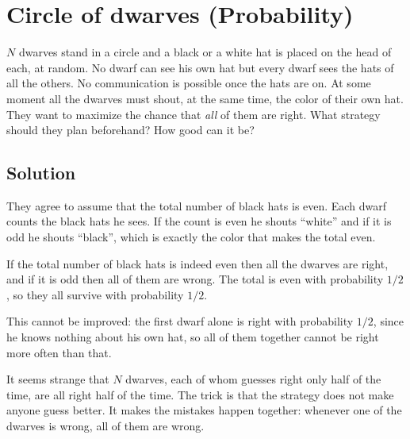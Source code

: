 \section {Circle of dwarves (Probability)}

$N$ dwarves stand in a circle and a black or a white hat is placed on the head of each, at random.
No dwarf can see his own hat but every dwarf sees the hats of all the others.
No communication is possible once the hats are on. At some moment all the dwarves must shout, at the same time, the color of their own hat.
They want to maximize the chance that \emph{all} of them are right. What strategy should they plan beforehand?
How good can it be?

\subsection{Solution}

They agree to assume that the total number of black hats is even.
Each dwarf counts the black hats he sees. If the count is even he shouts ``white'' and if it is odd he shouts ``black'',
which is exactly the color that makes the total even.

If the total number of black hats is indeed even then all the dwarves are right, and if it is odd then all of them are wrong.
The total is even with probability $1/2$, so they all survive with probability $1/2$.

This cannot be improved: the first dwarf alone is right with probability $1/2$, since he knows nothing about his own hat,
so all of them together cannot be right more often than that.

It seems strange that $N$ dwarves, each of whom guesses right only half of the time, are all right half of the time.
The trick is that the strategy does not make anyone guess better. It makes the mistakes happen together:
whenever one of the dwarves is wrong, all of them are wrong.

